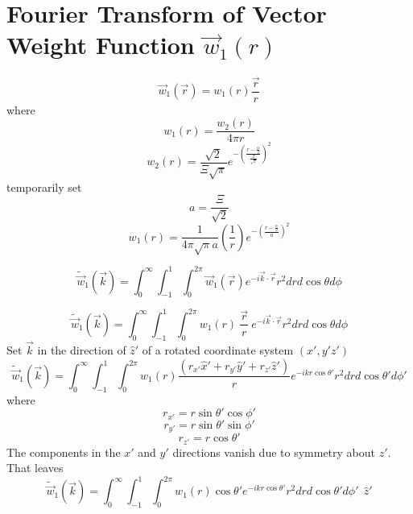 \documentclass[double,12pt]{beavtex}
\begin{document}
\section{Fourier Transform of Vector Weight Function $\vec{w}_{1}(r)$}
\begin{equation}{\vec{w}_1(\vec{r})=w_1(r)\frac{\vec{r}}{r}}\end{equation}
where
\begin{equation}{w_1(r)=\frac{w_2(r)}{4{\pi}r}}\end{equation}
\begin{equation}{w_2(r)=\frac{\sqrt{2}}{\Xi\sqrt{\pi}}e^{-\left(\frac{r-\frac{\alpha}{2}}{\frac{\Xi}{\sqrt{2}}}\right)^2}}\end{equation}
temporarily set 
\begin{equation}{a=\frac{\Xi}{\sqrt{2}}}\end{equation}
\begin{equation}{w_1(r)=\frac{1}{4{\pi}\sqrt{\pi}a}\left(\frac{1}{r}\right)e^{-\left(\frac{r-\frac{\alpha}{2}}{a}\right)^2}}\end{equation}

\begin{equation}{\widetilde{\vec{w}}_1(\vec{k})=\int_{0}^{\infty}\int_{-1}^{1}\int_{0}^{2\pi}\vec{w}_1(\vec{r})e^{-i\vec{k}\cdot{\vec{r}}}r^2d{r}d{\cos\theta}d{\phi}}\end{equation}

\begin{equation}{\widetilde{\vec{w}}_1(\vec{k})=\int_{0}^{\infty}\int_{-1}^{1}\int_{0}^{2\pi}w_1(r){~}\frac{\vec{r}}{r}{~}e^{-i\vec{k}\cdot{\vec{r}}}r^2d{r}d{\cos\theta}d{\phi}}\end{equation}
Set $\vec{k}$ in the direction of $\hat{z}'$ of a rotated 
coordinate system $(x',y'z')$ 
\begin{equation}{\widetilde{\vec{w}}_1(\vec{k})=\int_{0}^{\infty}\int_{-1}^{1}\int_{0}^{2\pi}w_1(r)\frac{(r_{x'}\hat{x}'+r_{y'}\hat{y}'+r_{z'}\hat{z}')}{r}e^{-ikr\cos\theta'}r^2d{r}d{\cos\theta'}d{\phi'}}\end{equation}
where
\begin{displaymath}{r_{x'}=r\sin\theta'\cos\phi'}\end{displaymath}
\begin{displaymath}{r_{y'}=r\sin\theta'\sin\phi'}\end{displaymath}
\begin{displaymath}{r_{z'}=r\cos\theta'}\end{displaymath} 
The components in the $x'$ and $y'$ directions vanish due to symmetry 
about $z'$. That leaves
\begin{equation}{\widetilde{\vec{w}}_1(\vec{k})=\int_{0}^{\infty}\int_{-1}^{1}\int_{0}^{2\pi}w_1(r)\cos{\theta}'e^{-ikr\cos\theta'}r^2d{r}d{\cos\theta'}d{\phi'}{~~}\hat{z}'}\end{equation}
\end{document}
